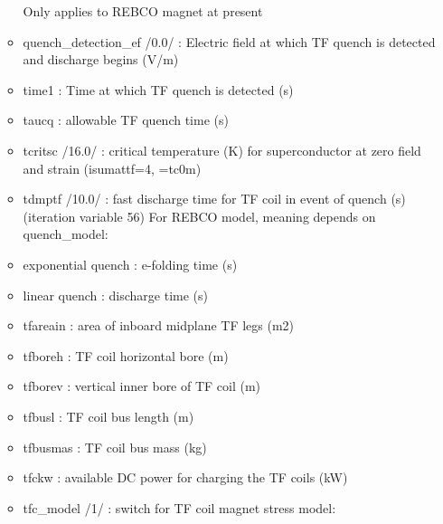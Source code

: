 \documentclass[]{article}
\begin{document}
\begin{itemize}
\begin{itemize}
    Only applies to REBCO magnet at present
  \item
    quench\_detection\_ef /0.0/ : Electric field at which TF quench is
    detected and discharge begins (V/m)
  \item
    time1 : Time at which TF quench is detected (s)
  \item
    taucq : allowable TF quench time (s)
  \item
    tcritsc /16.0/ : critical temperature (K) for superconductor at zero
    field and strain (isumattf=4, =tc0m)
  \item
    tdmptf /10.0/ : fast discharge time for TF coil in event of quench
    (s) (iteration variable 56) For REBCO model, meaning depends on
    quench\_model:
  \item
    exponential quench : e-folding time (s)
  \item
    linear quench : discharge time (s)
  \item
    tfareain : area of inboard midplane TF legs (m2)
  \item
    tfboreh : TF coil horizontal bore (m)
  \item
    tfborev : vertical inner bore of TF coil (m)
  \item
    tfbusl : TF coil bus length (m)
  \item
    tfbusmas : TF coil bus mass (kg)
  \item
    tfckw : available DC power for charging the TF coils (kW)
  \item
    tfc\_model /1/ : switch for TF coil magnet stress model:


\end{itemize}
\end{itemize}
\end{document}
